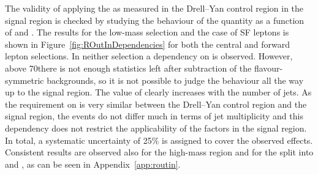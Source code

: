 
The validity of applying the \Routin as measured in the Drell--Yan control region in the signal region is checked by studying the behaviour of the quantity as a function of \MET and \njets. The results for the low-mass selection and the case of SF leptons is shown in Figure~\ref{fig:ROutInDependencies} for both the central and forward lepton selections. In neither selection a dependency on \MET is observed. However, above 70\GeV there is not enough statistics left after subtraction of the flavour-symmetric backgrounds, so it is not possible to judge the behaviour all the way up to the signal region. The value of \Routin clearly increases with the number of jets. As the requirement on \njets is very similar between the Drell--Yan control region and the signal region, the events do not differ much in terms of jet multiplicity and this dependency does not restrict the applicability of the \Routin factors in the signal region. In total, a systematic uncertainty of 25\% is assigned to cover the observed effects. Consistent results are observed also for the high-mass region and for the split into \EE and \MM, as can be seen in Appendix~\ref{app:routin}.

